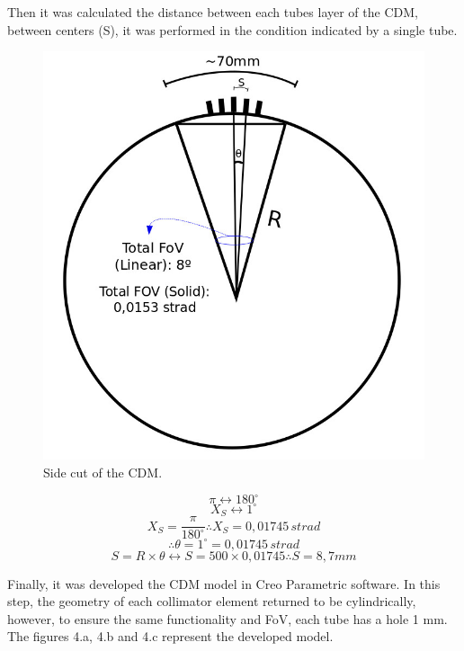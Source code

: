 \documentclass[a4paper,12pt]{article}
\begin{document}
Then it was calculated the distance between each tubes layer of the CDM, between centers (S), it was performed in the condition indicated by a single tube.
\begin{figure}[htb] 
	\centering
	\includegraphics[scale=0.25]{img/MCD_3.jpg}
	\caption{Side cut of the CDM.}
\end{figure}

$$ \pi \longleftrightarrow 180^{\circ}$$
$$ X_{S} \longleftrightarrow 1^{\circ}$$
$$X_{S} = \frac{\pi}{180^{\circ}} \therefore X_{S} = 0,01745\, strad$$
$$\therefore \theta = 1^{\circ} = 0,01745 \,strad$$
$$S= R\times \theta \longleftrightarrow S= 500\times 0,01745 \therefore S=8,7mm $$

Finally, it was developed the CDM model in Creo Parametric software. In this step,
the geometry of each collimator element returned to be cylindrically, however, to ensure the
same functionality and FoV, each tube has a hole 1 mm. The figures 4.a,
4.b and 4.c represent the developed model.
\end{document}
